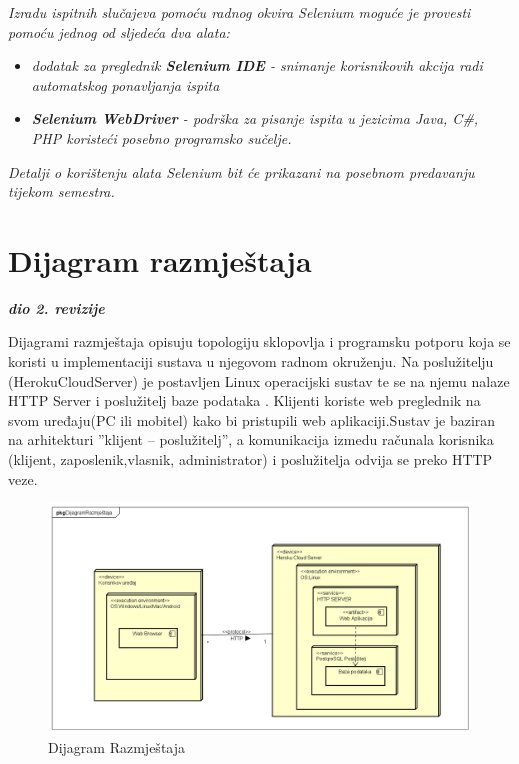 			 \textit{Izradu ispitnih slučajeva pomoću radnog okvira Selenium moguće je provesti pomoću jednog od sljedeća dva alata:}
			 \begin{itemize}
			 	\item \textit{dodatak za preglednik \textbf{Selenium IDE} - snimanje korisnikovih akcija radi automatskog ponavljanja ispita	}
			 	\item \textit{\textbf{Selenium WebDriver} - podrška za pisanje ispita u jezicima Java, C\#, PHP koristeći posebno programsko sučelje.}
			 \end{itemize}
		 	\textit{Detalji o korištenju alata Selenium bit će prikazani na posebnom predavanju tijekom semestra.}
			
			\eject 
\section{Dijagram razmještaja}
	
	\textbf{\textit{dio 2. revizije}}
	
	\text Dijagrami razmještaja opisuju topologiju sklopovlja i programsku potporu koja se koristi u implementaciji sustava u njegovom radnom okruženju. Na poslužitelju
	(HerokuCloudServer) je postavljen Linux operacijski sustav te se na njemu nalaze HTTP Server i poslužitelj baze podataka . Klijenti koriste web preglednik na svom uređaju(PC ili mobitel) kako bi pristupili web aplikaciji.Sustav je baziran na arhitekturi ”klijent – poslužitelj”, a komunikacija izmedu računala korisnika (klijent, zaposlenik,vlasnik, administrator) i poslužitelja odvija se preko HTTP veze.  

		\begin{figure}[H]
			\includegraphics[scale=0.5]{slike/Dijagram Razmjestaja.png} %
			\centering
			\caption { Dijagram Razmještaja}
			\label{fig:5.1}
			\end{figure}


